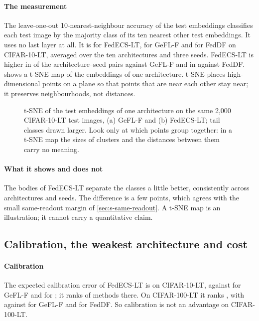 \paragraph{The measurement} The leave-one-out 10-nearest-neighbour accuracy of the test embeddings classifies each
test image by the majority class of its ten nearest other test embeddings. It uses no last layer at all. It is
 for FedECS-LT,  for GeFL-F and 
for FedDF on CIFAR-10-LT, averaged over the ten architectures and three seeds. FedECS-LT is higher in
 of the  architecture--seed pairs against GeFL-F and in
 against FedDF.  shows a t-SNE map of the embeddings of one
architecture. t-SNE places high-dimensional points on a plane so that points that are near each other stay near; it
preserves neighbourhoods, not distances.

\begin{figure}[t]
\centering
{}
\caption{t-SNE of the test embeddings of one architecture on the same 2,000 CIFAR-10-LT test images, (a) GeFL-F and (b)
FedECS-LT; tail classes drawn larger. Look only at which points group together: in a t-SNE map the sizes of clusters
and the distances between them carry no meaning.}
\label{fig:s-tsne}
\end{figure}

\paragraph{What it shows and does not} The bodies of FedECS-LT separate the classes a little better, consistently
across architectures and seeds. The difference is a few points, which agrees with the small same-readout margin of
\cref{sec:s-same-readout}. A t-SNE map is an illustration; it cannot carry a quantitative claim.

\subsection{Calibration, the weakest architecture and cost}

\paragraph{Calibration} The expected calibration error of FedECS-LT is  on CIFAR-10-LT,
against  for GeFL-F and  for ; it
ranks  of  methods there. On CIFAR-100-LT it ranks
, with  against  for GeFL-F and
 for FedDF. So calibration is not an advantage on CIFAR-100-LT.

